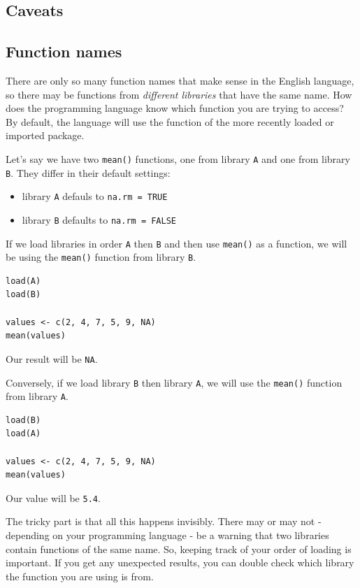 \documentclass[
]{book}
\providecommand{\tightlist}{%
  \setlength{\itemsep}{0pt}\setlength{\parskip}{0pt}}
\begin{document}
\subsection{Caveats}\label{caveats-2}

\subsection{Function names}\label{function-names}

There are only so many function names that make sense in the English language, so there may be functions from \emph{different libraries} that have the same name. How does the programming language know which function you are trying to access? By default, the language will use the function of the more recently loaded or imported package.

Let's say we have two \texttt{mean()} functions, one from library \texttt{A} and one from library \texttt{B}. They differ in their default settings:

\begin{itemize}
\tightlist
\item
  library \texttt{A} defauls to \texttt{na.rm\ =\ TRUE}
\item
  library \texttt{B} defaults to \texttt{na.rm\ =\ FALSE}
\end{itemize}

If we load libraries in order \texttt{A} then \texttt{B} and then use \texttt{mean()} as a function, we will be using the \texttt{mean()} function from library \texttt{B}.

\begin{verbatim}
load(A)
load(B)

values <- c(2, 4, 7, 5, 9, NA)
mean(values)
\end{verbatim}

Our result will be \texttt{NA}.

Conversely, if we load library \texttt{B} then library \texttt{A}, we will use the \texttt{mean()} function from library \texttt{A}.

\begin{verbatim}
load(B)
load(A)

values <- c(2, 4, 7, 5, 9, NA)
mean(values)
\end{verbatim}

Our value will be \texttt{5.4}.

The tricky part is that all this happens invisibly. There may or may not - depending on your programming language - be a warning that two libraries contain functions of the same name. So, keeping track of your order of loading is important. If you get any unexpected results, you can double check which library the function you are using is from.\\
\end{document}
